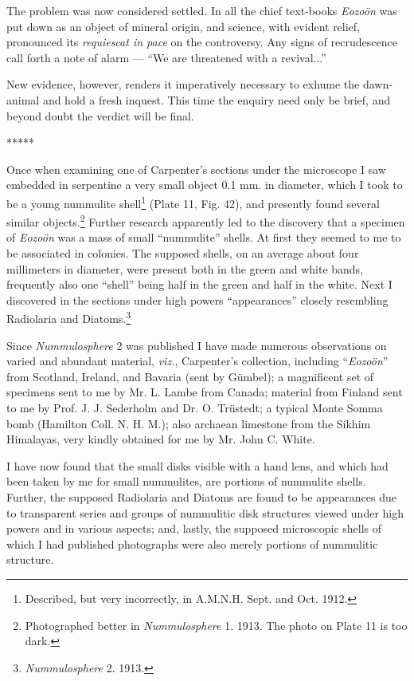 \documentclass[a4paper, 12pt, oneside]{article}
\begin{document}
The problem was now considered settled. In all the chief text-books \emph{Eozoön} was put down as an object of mineral origin, and science, with evident relief, pronounced its \emph{requiescat in pace} on the controversy. Any signs of recrudescence call forth a note of alarm --- ``We are threatened with a revival...''

New evidence, however, renders it imperatively necessary to exhume the dawn-animal and hold a fresh inquest. This time the enquiry need only be brief, and beyond doubt the verdict will be final.

\centerline{*\hspace{15mm}*\hspace{15mm}*\hspace{15mm}*\hspace{15mm}*}
\bigskip

Once when examining one of Carpenter's sections under the microscope I saw embedded in serpentine a very small object 0.1 mm. in diameter, which I took to be a young nummulite shell\footnote{Described, but very incorrectly, in A.M.N.H. Sept. and Oct. 1912.} (Plate 11, Fig. 42), and presently found several similar objects.\footnote{Photographed better in \emph{Nummulosphere} 1. 1913. The photo on Plate 11 is too dark.} Further research apparently led to the discovery that a specimen of \emph{Eozoön} was a mass of small ``nummulite'' shells. At first they seemed to me to be associated in colonies. The supposed shells, on an average about four millimeters in diameter, were present both in the green and white bands, frequently also one ``shell'' being half in the green and half in the white. Next I discovered in the sections under high powers ``appearances'' closely resembling Radiolaria and Diatoms.\footnote{\emph{Nummulosphere} 2. 1913.}

Since \emph{Nummulosphere} 2 was published I have made numerous observations on varied and abundant material, \emph{viz.}, Carpenter's collection, including ``\emph{Eozoön}'' from Scotland, Ireland, and Bavaria (sent by Gümbel); a magnificent set of specimens sent to me by Mr. L. Lambe from Canada; material from Finland sent to me by Prof. J. J. Sederholm and Dr. O. Trüstedt; a typical Monte Somma bomb (Hamilton Coll. N. H. M.); also archaean limestone from the Sikhim Himalayas, very kindly obtained for me by Mr. John C. White.

I have now found that the small disks visible with a hand lens, and which had been taken by me for small nummulites, are portions of nummulite shells. Further, the supposed Radiolaria and Diatoms are found to be appearances due to transparent series and groups of nummulitic disk structures viewed under high powers and in various aspects; and, lastly, the supposed microscopic shells of which I had published photographs were also merely portions of nummulitic structure.
\end{document}
